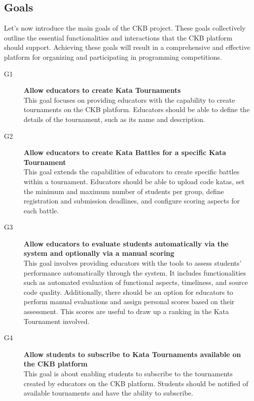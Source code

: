 \documentclass[11pt]{report}
\begin{document}
    \subsection*{Goals} \label{goals}
    Let's now introduce the main goals of the CKB project.
    These goals collectively outline the essential functionalities and interactions that the CKB platform should support.
    Achieving these goals will result in a comprehensive and effective platform
    for organizing and participating in programming competitions.
    \begin{description}
        \item[G1] \textbf{Allow educators to create Kata Tournaments}
            \\ 
            This goal focuses on providing educators with the capability to create tournaments on the CKB platform.
            Educators should be able to define the details of the tournament, such as its name and description.
    \newpage
        \item[G2] \textbf{Allow educators to create Kata Battles for a specific Kata Tournament}
            \\
            This goal extends the capabilities of educators to create specific battles within a tournament.
            Educators should be able to upload code katas, set the minimum and maximum number of students per group,
            define registration and submission deadlines, and configure scoring aspects for each battle.
        \item[G3] \textbf{Allow educators to evaluate students automatically via the system and optionally via a manual scoring}
            \\
            This goal involves providing educators with the tools to assess students' performance automatically through the system.
             It includes functionalities such as automated evaluation of functional aspects, timeliness, and source code quality.
            Additionally, there should be an option for educators to perform manual evaluations and assign personal scores based
            on their assessment.
            This scores are useful to draw up a ranking in the Kata Tournament involved.
        \item[G4] \textbf{Allow students to subscribe to Kata Tournaments available on the CKB platform}
            \\
            This goal is about enabling students to subscribe to the tournaments created by educators on the CKB platform.
            Students should be notified of available tournaments and have the ability to subscribe.

\end{description}
\end{document}
